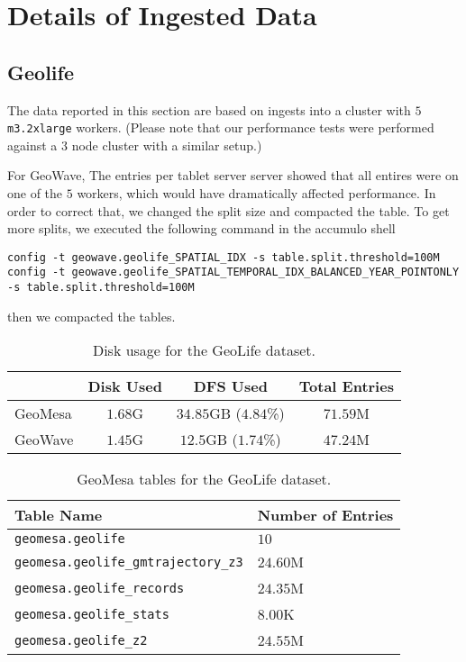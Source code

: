 \section{Details of Ingested Data}
\label{appendix:data}

\subsection{Geolife}

The data reported in this section are based on ingests into a cluster with $5$ \texttt{m3.2xlarge} workers.
(Please note that our performance tests were performed against a $3$ node cluster with a similar setup.)

For GeoWave, The entries per tablet server server showed that all entires were on one of the $5$ workers, which would have dramatically affected performance.
In order to correct that, we changed the split size and compacted the table.
To get more splits, we executed the following command in the accumulo shell
{\footnotesize
\begin{verbatim}
config -t geowave.geolife_SPATIAL_IDX -s table.split.threshold=100M
config -t geowave.geolife_SPATIAL_TEMPORAL_IDX_BALANCED_YEAR_POINTONLY -s table.split.threshold=100M
\end{verbatim}
}
then we compacted the tables.

\begin{table}[h!tb]
  \centering
  \begin{tabular}{ | l || c | c | c | }
    \hline
    & Disk Used & DFS Used & Total Entries \\
    \hline
    GeoMesa & $1.68$G & $34.85$GB ($4.84$\%) & $71.59$M \\
    GeoWave & $1.45$G & $12.5$GB ($1.74$\%) & $47.24$M \\
    \hline
  \end{tabular}
  \caption{Disk usage for the GeoLife dataset.}
  \label{table:geolife:disk}
\end{table}

\begin{table}[h!tb]
  \centering
  \begin{tabular}{ | l | l | }
    \hline
    Table Name & Number of Entries \\
    \hline
    \texttt{geomesa.geolife} & $10$ \\
    \texttt{geomesa.geolife\_gmtrajectory\_z3} & $24.60$M \\
    \texttt{geomesa.geolife\_records} & $24.35$M \\
    \texttt{geomesa.geolife\_stats} & $8.00$K \\
    \texttt{geomesa.geolife\_z2} & $24.55$M \\
    \hline
  \end{tabular}
  \caption{GeoMesa tables for the GeoLife dataset.}
  \label{table:geolife:geomesa:tables}
\end{table}

